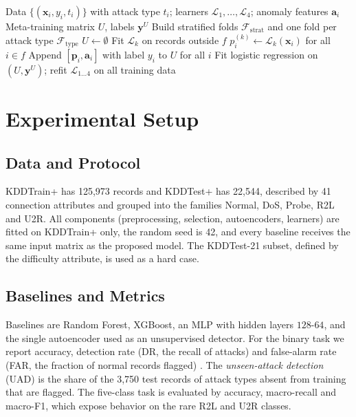 \documentclass[journal]{IEEEtran}
\begin{document}
\begin{algorithm}[!t]
\caption{Novelty-aware meta-training set}
\label{alg:meta}
\begin{algorithmic}[1]
\Require Data $\{(\mathbf{x}_i,y_i,t_i)\}$ with attack type $t_i$; learners $\mathcal{L}_1,\dots,\mathcal{L}_4$; anomaly features $\mathbf{a}_i$
\Ensure Meta-training matrix $U$, labels $\mathbf{y}^U$
\State Build stratified folds $\mathcal{F}_{\mathrm{strat}}$ and one fold per attack type $\mathcal{F}_{\mathrm{type}}$
\State $U\gets\emptyset$
      \State Fit $\mathcal{L}_k$ on records outside $f$
      \State $p^{(k)}_i\gets\mathcal{L}_k(\mathbf{x}_i)$ for all $i\in f$
    \EndFor
  \EndFor
  \State Append $[\mathbf{p}_i,\mathbf{a}_i]$ with label $y_i$ to $U$ for all $i$
\EndFor
\State Fit logistic regression on $(U,\mathbf{y}^U)$; refit $\mathcal{L}_{1\dots 4}$ on all training data
\end{algorithmic}
\end{algorithm}

\section{Experimental Setup}
\label{sec:setup}
\subsection{Data and Protocol}
KDDTrain+ has 125{,}973 records and KDDTest+ has 22{,}544, described by 41 connection attributes and grouped into the families Normal, DoS, Probe, R2L and U2R. All components (preprocessing, selection, autoencoders, learners) are fitted on KDDTrain+ only, the random seed is 42, and every baseline receives the same input matrix as the proposed model. The KDDTest-21 subset, defined by the difficulty attribute, is used as a hard case.

\subsection{Baselines and Metrics}
Baselines are Random Forest, XGBoost, an MLP with hidden layers $128\text{-}64$, and the single autoencoder used as an unsupervised detector. For the binary task we report accuracy, detection rate (DR, the recall of attacks) and false-alarm rate (FAR, the fraction of normal records flagged) \cite{powers2011}. The \emph{unseen-attack detection} (UAD) is the share of the 3{,}750 test records of attack types absent from training that are flagged. The five-class task is evaluated by accuracy, macro-recall and macro-F1, which expose behavior on the rare R2L and U2R classes.
\end{document}
